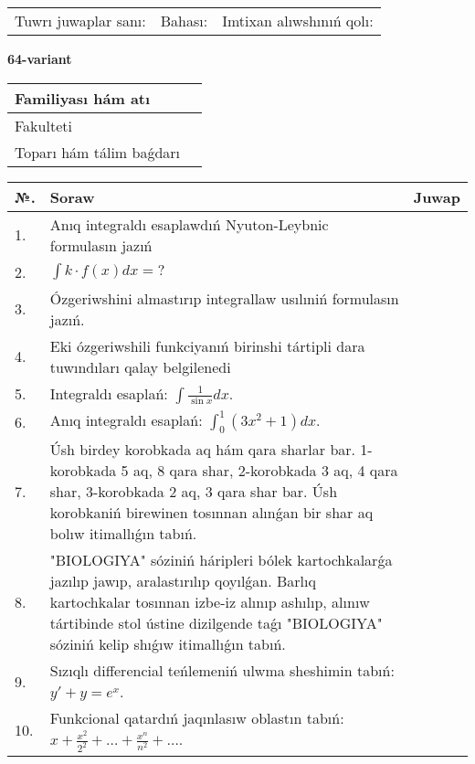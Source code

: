 \documentclass{article}
\begin{document}
\vspace{1cm}

\begin{tabular}{ c c c }
Tuwrı juwaplar sanı: \underline{\hspace{2cm}} & Bahası: \underline{\hspace{2cm}} & Imtixan alıwshınıń qolı: \underline{\hspace{2cm}} \\
\end{tabular}

\newpage

\begin{center}\textbf{64-variant}\end{center}

\bgroup
\def\arraystretch{1.5}
\begin{tabular}{ |m{6cm}|m{10cm}| }
  \hline
  Familiyası hám atı & \\
  \hline
  Fakulteti &\\
  \hline
  Toparı hám tálim baǵdarı & \\
  \hline
\end{tabular}
\egroup

\vspace{0.5cm}

\bgroup
\def\arraystretch{2}
\begin{tabular}{ |l|m{8cm}|m{7cm}| }
  \hline
  №. & Soraw & Juwap \\
  \hline
  1. & Anıq integraldı esaplawdıń Nyuton-Leybnic formulasın jazıń &  \\
  \hline
  2. & $\displaystyle\int k \cdot f(x)dx = ?$ &  \\
  \hline
  3. & Ózgeriwshini almastırıp integrallaw usılıniń formulasın jazıń. &  \\
  \hline
  4. & Eki ózgeriwshili funkciyanıń birinshi tártipli dara tuwındıları qalay belgilenedi &  \\
  \hline
  5. & Integraldı esaplań: $\displaystyle\int {\frac{1}{\sin x}dx} $. &  \\
  \hline
  6. & Anıq integraldı esaplań: $\displaystyle\int_{0}^{1}{(3x^{2} + 1)dx}$. &  \\
  \hline
  7. & Úsh birdey korobkada aq hám qara sharlar bar. 1-korobkada 5 aq, 8 qara shar, 2-korobkada 3 aq, 4 qara shar, 3-korobkada 2 aq, 3 qara shar bar. Úsh korobkaniń birewinen tosınnan alınǵan bir shar aq bolıw itimallıǵın tabıń. &  \\
  \hline
  8. & "BIOLOGIYA" sóziniń háripleri bólek kartochkalarǵa jazılıp jawıp, aralastırılıp qoyılǵan. Barlıq kartochkalar tosınnan izbe-iz alınıp ashılıp, alınıw tártibinde stol ústine dizilgende taǵı "BIOLOGIYA" sóziniń kelip shıǵıw itimallıǵın tabıń. &  \\
  \hline
  9. & Sızıqlı differencial teńlemeniń ulwma sheshimin tabıń: $y' + y =e^{x}$. &  \\
  \hline
  10. & Funkcional qatardıń jaqınlasıw oblastın tabıń: $\displaystyle x + \frac{x^{2}}{2^{2}} + \ldots + \frac{x^{n}}{n^{2}} + \ldots$. &  \\
  \hline
\end{tabular}
\egroup
\end{document}
